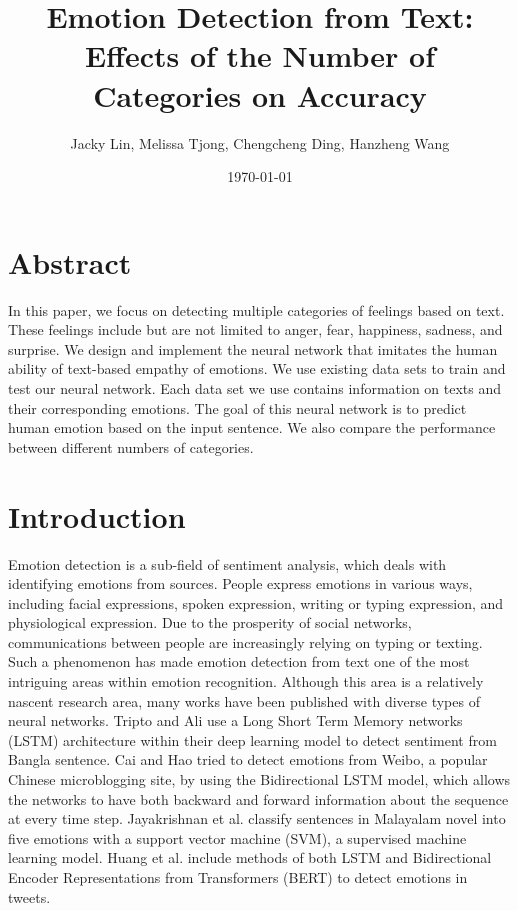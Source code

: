 \documentclass[11pt,a4paper,man,floatsintext]{apa6}
\title{\large{Emotion Detection from Text: Effects of the Number of Categories on Accuracy}}
\author{Jacky Lin, Melissa Tjong, Chengcheng Ding, Hanzheng Wang}
\affiliation{Department of Computer Science, \\Bucknell University, \\
Lewisburg, PA 17837}
\date{\today}
\begin{document}
\maketitle

\section{Abstract}

In this paper, we focus on detecting multiple categories of feelings based on text. These feelings include but are not limited to anger, fear, happiness, sadness, and surprise. We design and implement the neural network that imitates the human ability of text-based empathy of emotions. We use existing data sets to train and test our neural network. Each data set we use contains information on texts and their corresponding emotions. The goal of this neural network is to predict human emotion based on the input sentence. We also compare the performance between different numbers of categories.

\newpage

\section{Introduction}
Emotion detection is a sub-field of sentiment analysis, which deals with identifying emotions from sources. People express emotions in various ways, including facial expressions, spoken expression, writing or typing expression, and physiological expression. Due to the prosperity of social networks, communications between people are increasingly relying on typing or texting. Such a phenomenon has made emotion detection from text one of the most intriguing areas within emotion recognition. Although this area is a relatively nascent research area, many works have been published with diverse types of neural networks. Tripto and Ali \cite{lstmeg} use a Long Short Term Memory networks (LSTM) architecture within their deep learning model to detect sentiment from Bangla sentence. Cai and Hao \cite{Cai} tried to detect emotions from Weibo, a popular Chinese microblogging site, by using the Bidirectional LSTM model, which allows the networks to have both backward and forward information about the sequence at every time step. Jayakrishnan et al. \cite{svmeg} classify sentences in Malayalam novel into five emotions with a support vector machine (SVM), a supervised machine learning model. Huang et al. \cite{breteg} include methods of both LSTM and Bidirectional Encoder Representations from Transformers (BERT) to detect emotions in tweets.
\end{document}
